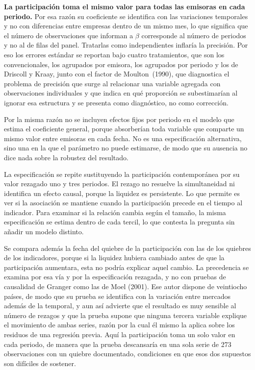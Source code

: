 \textbf{La participación toma el mismo valor para todas las emisoras en cada periodo.} Por esa razón su coeficiente se identifica con las variaciones temporales y no con diferencias entre empresas dentro de un mismo mes, lo que significa que el número de observaciones que informan a $\beta$ corresponde al número de periodos y no al de filas del panel. Tratarlas como independientes inflaría la precisión. Por eso los errores estándar se reportan bajo cuatro tratamientos, que son los convencionales, los agrupados por emisora, los agrupados por periodo y los de Driscoll y Kraay, junto con el factor de Moulton~(1990), que diagnostica el problema de precisión que surge al relacionar una variable agregada con observaciones individuales y que indica en qué proporción se subestimarían al ignorar esa estructura y se presenta como diagnóstico, no como corrección.

Por la misma razón no se incluyen efectos fijos por periodo en el modelo que estima el coeficiente general, porque absorberían toda variable que comparte un mismo valor entre emisoras en cada fecha. No es una especificación alternativa, sino una en la que el parámetro no puede estimarse, de modo que su ausencia no dice nada sobre la robustez del resultado.

La especificación se repite sustituyendo la participación contemporánea por su valor rezagado uno y tres periodos. El rezago no resuelve la simultaneidad ni identifica un efecto causal, porque la liquidez es persistente. Lo que permite es ver si la asociación se mantiene cuando la participación precede en el tiempo al indicador. Para examinar si la relación cambia según el tamaño, la misma especificación se estima dentro de cada tercil, lo que contesta la pregunta sin añadir un modelo distinto.

Se compara además la fecha del quiebre de la participación con las de los quiebres de los indicadores, porque si la liquidez hubiera cambiado antes de que la participación aumentara, esta no podría explicar aquel cambio. La precedencia se examina por esa vía y por la especificación rezagada, y no con pruebas de causalidad de Granger como las de Moel (2001). Ese autor dispone de veintiocho países, de modo que su prueba se identifica con la variación entre mercados además de la temporal, y aun así advierte que el resultado es muy sensible al número de rezagos y que la prueba supone que ninguna tercera variable explique el movimiento de ambas series, razón por la cual él mismo la aplica sobre los residuos de una regresión previa. Aquí la participación toma un solo valor en cada periodo, de manera que la prueba descansaría en una sola serie de 273 observaciones con un quiebre documentado, condiciones en que esos dos supuestos son difíciles de sostener.

